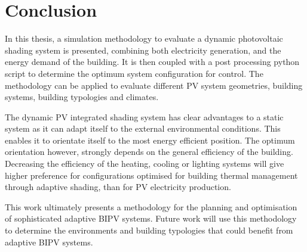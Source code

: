 \chapter{Conclusion}
\label{ch:conclusion}

In this thesis, a simulation methodology to evaluate a dynamic photovoltaic shading system is presented, combining both electricity generation, and the energy demand of the building. It is then coupled with a post processing python script to determine the optimum system configuration for control. The methodology can be applied to evaluate different PV system geometries, building systems, building typologies and climates.

The dynamic PV integrated shading system has clear advantages to a static system as it can adapt itself to the external environmental conditions. This enables it to orientate itself to the most energy efficient position. The optimum orientation however, strongly depends on the general efficiency of the building. Decreasing the efficiency of the heating, cooling or lighting systems will give higher preference for configurations optimised for building thermal management through adaptive shading, than for PV electricity production.


This work ultimately presents a methodology for the planning and optimisation of sophisticated adaptive BIPV systems. Future work will use this methodology to determine the environments and building typologies that could benefit from adaptive BIPV systems. 